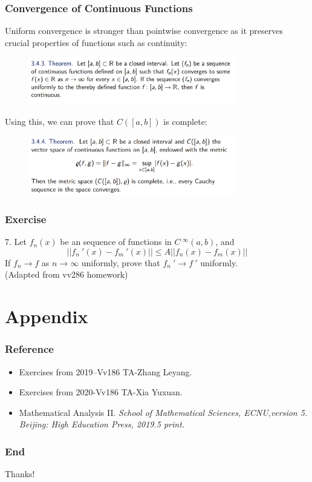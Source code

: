 \documentclass{beamer}
\newcommand{\myfont}{\rmfamily\normalsize\upshape\mdseries}
\begin{document}
\begin{frame}
    \frametitle{Convergence of Continuous Functions}
    \hspace{1em}    
    Uniform convergence is stronger than pointwise convergence as it
preserves crucial properties of functions such as continuity:
    \begin{figure}[h!]
        \centering
        \includegraphics[width=0.8\textwidth]{cont.png}
    \end{figure}
    Using this, we can prove that $C([a, b])$ is complete:
    \begin{figure}
        \centering
        \includegraphics[width=0.8\textwidth]{complete.png}
    \end{figure}
\end{frame}

\begin{frame}
    \frametitle{Exercise}
    7. Let $f_n(x)$ be an  sequence of functions in $C~^\infty (a,b)$, and 
    $$||f_n~'(x)-f_m~'(x)||\leq A ||f_n(x)-f_m(x)||$$ If $f_n\to f$ as $n\to \infty$
    uniformly, prove that $f_n~' \to f~'$ uniformly. \\(Adapted from vv286 homework)
\end{frame}
\section{Appendix}



\begin{frame}
    \frametitle{Reference}
    \begin{itemize}
        \item Exercises from 2019–Vv186 TA-Zhang Leyang.
        \item Exercises from 2020-Vv186 TA-Xia Yuxuan.
        \item Mathematical Analysis II. \itshape School of Mathematical Sciences, ECNU,\myfont version 5. 
        Beijing: High Education Press, 2019.5 print.
    \end{itemize}
\end{frame}
\begin{frame}
    \frametitle{End}
    \centering
    \LARGE{Thanks!}
    

\end{frame}
\end{document}
